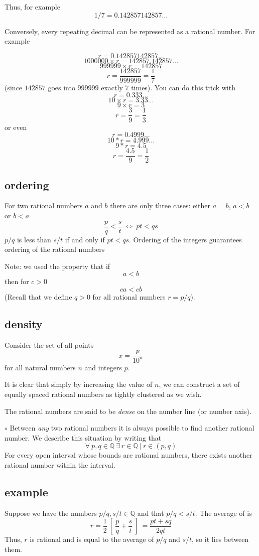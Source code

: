 \documentclass[11pt, oneside]{article}   	%
\begin{document}
Thus, for example
\[ 1/7 = 0.142857142857 \dots \]

Conversely, every repeating decimal can be represented as a rational number.  For example

\[ r = 0.142857142857 \dots \]
\[ 1000000 \times r = 142857.142857 \dots \]
\[ 999999 \times r = 142857 \]
\[ r = \frac{142857}{999999} = \frac{1}{7} \]
(since $142857$ goes into $999999$ exactly $7$ times).  You can do this trick with 
\[ r = 0.333 \dots \]
\[ 10 \times r = 3.33 \dots \]
\[ 9 \times r = 3 \]
\[ r = \frac{3}{9} = \frac{1}{3} \]
or even
\[ r = 0.4999 \dots \]
\[ 10*r = 4.999 \dots \]
\[ 9*r = 4.5 \]
\[ r = \frac{4.5}{9} = \frac{1}{2} \]

\subsection*{ordering}
For two rational numbers $a$ and $b$ there are only three cases:  either $a=b$, $a < b$ or $b < a$
\[ \frac{p}{q} < \frac{s}{t} \ \iff \ pt < qs \]
$p/q$ is less than $s/t$ if and only if $pt < qs$.  Ordering of the integers guarantees ordering of the rational numbers

Note:  we used the property that if
\[ a < b \]
then for $c > 0$
\[ ca < cb \]
(Recall that we define $q > 0$ for all rational numbers $r = p/q$).

\subsection*{density}
Consider the set of all points
\[ x = \frac{p}{10^n} \]
for all natural numbers $n$ and integers $p$.

It is clear that simply by increasing the value of $n$, we can construct a set of equally spaced rational numbers as tightly clustered as we wish.

The rational numbers are said to be \emph{dense} on the number line (or number axis).  

$\circ$  Between \emph{any} two rational numbers it is always possible to find another rational number.  We describe this situation by writing that
\[ \forall \ p,q \in \mathbb{Q} \ \exists \ r \in \mathbb{Q} \ | \ r \in (p,q) \]
For every open interval whose bounds are rational numbers, there exists another rational number within the interval.

\subsection*{example}
Suppose we have the numbers $p/q, s/t \in \mathbb{Q}$ and that $p/q < s/t$.  The average of is
\[ r = \frac{1}{2} \ [ \  \frac{p}{q} + \frac{s}{t} \ ] \ = \frac{pt+sq}{2qt} \]
Thus, $r$ is rational and is equal to the average of $p/q$ and $s/t$, so it lies between them.  
\end{document}
